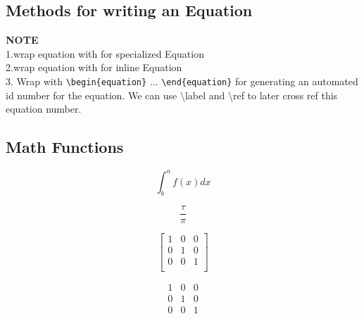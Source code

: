 \documentclass{article}
\begin{document}
\subsection{Methods for writing an Equation}
\textbf{NOTE}\\
1.wrap equation with \textdollar \textdollar \space for specialized Equation\\
2.wrap equation with \textdollar \space for inline Equation\\
3. Wrap with \verb|\begin{equation}| ... \verb|\end{equation}| for generating an automated id number for the equation. We can use \textbackslash label and \textbackslash ref to later cross ref this equation number. 



\subsection{Math Functions}

$$ \int^a_b f(x)dx $$

$$ \frac{\tau}{\pi} $$


\begin{equation}
	\begin{bmatrix}
		1 & 0 & 0 \\
		0 & 1 & 0 \\
		0 & 0 & 1 \\
	\end{bmatrix}
\end{equation}


\begin{equation}
\begin{matrix}
1 & 0 & 0 \\
0 & 1 & 0 \\
0 & 0 & 1 \\
\end{matrix}
\end{equation}



 
\end{document}

